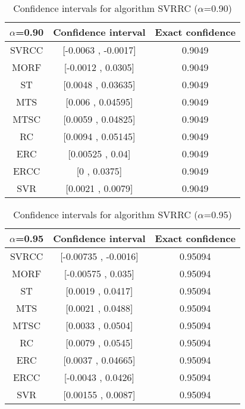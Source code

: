 \documentclass[a4paper,10pt]{article}
\begin{document}
\begin{table}[!htp]
\centering\small
\begin{tabular}{
|c|c|c|}
\hline
 $\alpha$=0.90 & Confidence interval & Exact confidence \\ \hline 
SVRCC & [-0.0063 , -0.0017] & 0.9049\\ \hline 
MORF & [-0.0012 , 0.0305] & 0.9049\\ \hline 
ST & [0.0048 , 0.03635] & 0.9049\\ \hline 
MTS & [0.006 , 0.04595] & 0.9049\\ \hline 
MTSC & [0.0059 , 0.04825] & 0.9049\\ \hline 
RC & [0.0094 , 0.05145] & 0.9049\\ \hline 
ERC & [0.00525 , 0.04] & 0.9049\\ \hline 
ERCC & [0 , 0.0375] & 0.9049\\ \hline 
SVR & [0.0021 , 0.0079] & 0.9049\\ \hline 

\end{tabular}
\caption{Confidence intervals for algorithm SVRRC ($\alpha$=0.90)}
\end{table}
\begin{table}[!htp]
\centering\small
\begin{tabular}{
|c|c|c|}
\hline
 $\alpha$=0.95 & Confidence interval & Exact confidence \\ \hline 
SVRCC & [-0.00735 , -0.0016] & 0.95094\\ \hline 
MORF & [-0.00575 , 0.035] & 0.95094\\ \hline 
ST & [0.0019 , 0.0417] & 0.95094\\ \hline 
MTS & [0.0021 , 0.0488] & 0.95094\\ \hline 
MTSC & [0.0033 , 0.0504] & 0.95094\\ \hline 
RC & [0.0079 , 0.0545] & 0.95094\\ \hline 
ERC & [0.0037 , 0.04665] & 0.95094\\ \hline 
ERCC & [-0.0043 , 0.0426] & 0.95094\\ \hline 
SVR & [0.00155 , 0.0087] & 0.95094\\ \hline 

\end{tabular}
\caption{Confidence intervals for algorithm SVRRC ($\alpha$=0.95)}
\end{table}

 \clearpage 
\end{document}
